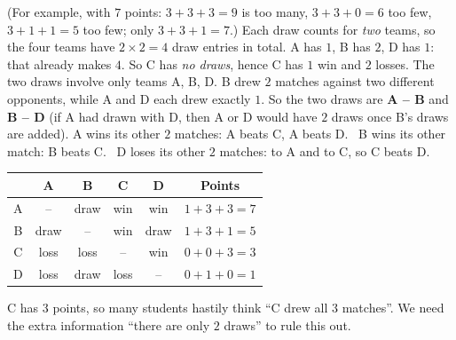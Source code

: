 {\begin{center}
\begin{tabular}{|c|c|l|}
\end{tabular}
\end{center}
(For example, with $7$ points: $3 + 3 + 3 = 9$ is too many, $3 + 3 + 0 = 6$ too few, $3 + 1 + 1 = 5$ too few; only $3 + 3 + 1 = 7$.)
Each draw counts for \emph{two} teams, so the four teams have $2\times 2 = 4$ draw entries in total. A has $1$, B has $2$, D has $1$:
that already makes $4$. So C has \emph{no draws}, hence C has $1$ win and $2$ losses.
The two draws involve only teams A, B, D. B drew $2$ matches against two different opponents, while A and D each drew exactly $1$. So
the two draws are \textbf{A -- B} and \textbf{B -- D} (if A had drawn with D, then A or D would have $2$ draws once B's draws are added).
A wins its other $2$ matches: A beats C, A beats D. \ B wins its other match: B beats C. \ D loses its other $2$ matches: to A and to C,
so C beats D.
\begin{center}\small
\begin{tabular}{|c|c|c|c|c|c|}
\hline
\rowcolor{tmBlue!10} & A & B & C & D & Points\\ \hline
A & -- & draw & win & win & $1 + 3 + 3 = 7$\\ \hline
B & draw & -- & win & draw & $1 + 3 + 1 = 5$\\ \hline
C & loss & loss & -- & win & $0 + 0 + 3 = 3$\\ \hline
D & loss & draw & loss & -- & $0 + 1 + 0 = 1$\\ \hline
\end{tabular}
\end{center}
\begin{warnbox}C has $3$ points, so many students hastily think ``C drew all $3$ matches''. We need the extra information ``there are only
$2$ draws'' to rule this out.\end{warnbox}
}

